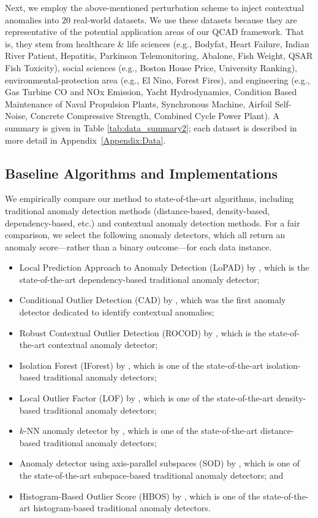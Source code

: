 \documentclass[pdflatex,sn-basic]{sn-jnl}%
\theoremstyle{thmstyleone}%
\theoremstyle{thmstyletwo}%
\theoremstyle{thmstylethree}%
\begin{document}
Next, we employ the above-mentioned perturbation scheme to inject contextual anomalies into $20$ real-world datasets. We use these datasets because they are representative of the potential application areas of our QCAD framework. That is, they stem from  healthcare \& life sciences (e.g., Bodyfat, Heart Failure, Indian River Patient, Hepatitis, Parkinson Telemonitoring, Abalone, Fish Weight, QSAR Fish Toxicity), social  sciences (e.g., Boston House Price, University Ranking), environmental-protection area (e.g., El Nino, Forest Fires), and engineering (e.g., Gas Turbine CO and NOx Emission,  Yacht Hydrodynamics, Condition Based Maintenance of Naval Propulsion Plants, Synchronous Machine, Airfoil Self-Noise, Concrete Compressive Strength, Combined Cycle Power Plant). A summary is given in Table \ref{tab:data_summary2}; each dataset is described in more detail in Appendix~\ref{Appendix:Data}.

\subsection{Baseline Algorithms and Implementations}
\label{subsec:baselines}

We empirically compare our method to state-of-the-art algorithms, including traditional anomaly detection methods (distance-based, density-based, dependency-based, etc.) and contextual anomaly detection methods. For a fair comparison, we select the following anomaly detectors, which all return an anomaly score---rather than a binary outcome---for each data instance.
\begin{itemize}
    \item Local Prediction Approach to Anomaly Detection (LoPAD) by \cite{lu2020lopad}, which is the state-of-the-art dependency-based traditional anomaly detector;
    \item Conditional Outlier Detection (CAD) by \cite{song2007conditional}, which was the first anomaly detector dedicated to identify contextual anomalies;
    \item Robust Contextual Outlier Detection (ROCOD) by \cite{liang2016robust}, which is the state-of-the-art contextual anomaly detector;
    \item Isolation Forest (IForest) by \cite{liu2008isolation},  which is one of the state-of-the-art isolation-based traditional anomaly detectors;
    \item Local Outlier Factor (LOF) by \cite{breunig2000lof}, which is one of the state-of-the-art density-based traditional anomaly detectors;
    \item $k$-NN anomaly detector by \cite{angiulli2002fast}, which is one of the state-of-the-art distance-based traditional anomaly detectors;
    \item Anomaly detector using axis-parallel subspaces (SOD) by \cite{kriegel2009outlier}, which is one of the state-of-the-art subspace-based traditional anomaly detectors; and
    \item Histogram-Based Outlier Score (HBOS) by \cite{goldstein2012histogram}, which is one of the state-of-the-art histogram-based traditional anomaly detectors.
\end{itemize}
\end{document}
